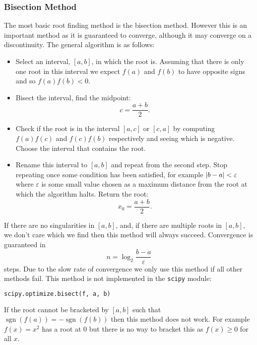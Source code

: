 \documentclass[a4paper]{article}
\DeclareMathOperator{\sgn}{sgn}
\begin{document}
    \subsubsection{Bisection Method}\label{sec:bisection method}
    The most basic root finding method is the bisection method.
    However this is an important method as it is guaranteed to converge, although it may converge on a discontinuity.
    The general algorithm is as follows:
    \begin{itemize}
        \item Select an interval, \([a, b]\), in which the root is.
        Assuming that there is only one root in this interval we expect \(f(a)\) and \(f(b)\) to have opposite signs and so \(f(a)f(b) < 0\).
        \item Bisect the interval, find the midpoint:
        \[c = \frac{a + b}{2}.\]
        \item Check if the root is in the interval \([a, c]\) or \([c, a]\) by computing \(f(a)f(c)\) and \(f(c)f(b)\) respectively and seeing which is negative.
        Choose the interval that contains the root.
        \item Rename this interval to \([a, b]\) and repeat from the second step.
        Stop repeating once some condition has been satisfied, for example \(\abs{b - a} < \varepsilon\) where \(\varepsilon\) is some small value chosen as a maximum distance from the root at which the algorithm halts.
        Return the root:
        \[x_0 = \frac{a + b}{2}.\]
    \end{itemize}
    If there are no singularities in \([a, b]\), and, if there are multiple roots in \([a, b]\), we don't care which we find then this method will always succeed.
    Convergence is guaranteed in
    \[n = \log_2\frac{b - a}{\varepsilon}\]
    steps.
    Due to the slow rate of convergence we only use this method if all other methods fail.
    This method is not implemented in the \lstinline[language=python]|scipy| module:
    \begin{lstlisting}[language=python]
    scipy.optimize.bisect(f, a, b)
    \end{lstlisting}
    
    If the root cannot be bracketed by \([a, b]\) such that \(\sgn(f(a)) = -\sgn(f(b))\) then this method does not work.
    For example \(f(x) = x^2\) has a root at \(0\) but there is no way to bracket this as \(f(x) \ge 0\) for all \(x\).
    
\end{document}
